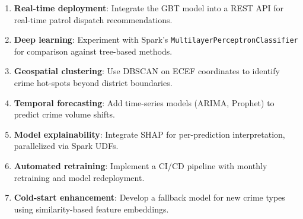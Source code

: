 \begin{enumerate}
    \item \textbf{Real-time deployment}: Integrate the GBT model into a REST API for real-time patrol dispatch recommendations.
    \item \textbf{Deep learning}: Experiment with Spark's \texttt{MultilayerPerceptronClassifier} for comparison against tree-based methods.
    \item \textbf{Geospatial clustering}: Use DBSCAN on ECEF coordinates to identify crime hot-spots beyond district boundaries.
    \item \textbf{Temporal forecasting}: Add time-series models (ARIMA, Prophet) to predict crime volume shifts.
    \item \textbf{Model explainability}: Integrate SHAP for per-prediction interpretation, parallelized via Spark UDFs.
    \item \textbf{Automated retraining}: Implement a CI/CD pipeline with monthly retraining and model redeployment.
    \item \textbf{Cold-start enhancement}: Develop a fallback model for new crime types using similarity-based feature embeddings.
\end{enumerate}
